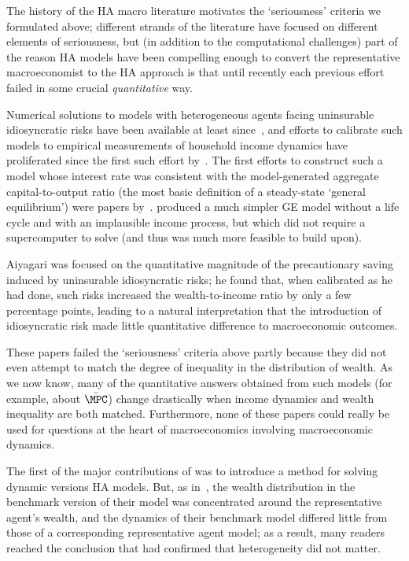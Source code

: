 \documentclass[titlepage]{econtex}
\begin{document}
The history of the HA macro literature motivates the `seriousness' criteria we formulated above; different strands of the literature have focused on different elements of seriousness, but (in addition to the computational challenges) part of the reason HA models have been compelling enough to convert the representative macroeconomist to the HA approach is that until recently each previous effort failed in some crucial {\it quantitative} way.

Numerical solutions to models with heterogeneous agents facing uninsurable idiosyncratic risks have been available at least since~\cite{zeldesStochastic}, and efforts to calibrate such models to empirical measurements of household income dynamics have proliferated since the first such effort by~\cite{carroll:brookings}.  The first efforts to construct such a model whose interest rate was consistent with the model-generated aggregate capital-to-output ratio (the most basic definition of a steady-state `general equilibrium') were papers by~\cite{hsz:importance,hsz:insurance}.  \cite{aiyagari:ge} produced a much simpler GE model without a life cycle and with an implausible income process, but which did not require a supercomputer to solve (and thus was much more feasible to build upon).

Aiyagari was focused on the quantitative magnitude of the precautionary saving induced by uninsurable idiosyncratic risks; he found that, when calibrated as he had done, such risks increased the wealth-to-income ratio by only a few percentage points, leading to a natural interpretation that the introduction of idiosyncratic risk made little quantitative difference to macroeconomic outcomes.

These papers failed the `seriousness' criteria above partly because they did not even attempt to match the degree of inequality in the distribution of wealth.  As we now know, many of the quantitative answers obtained from such models (for example, about $\bar{\MPC}$) change drastically when income dynamics and wealth inequality are both matched.  Furthermore, none of these papers could really be used for questions at the heart of macroeconomics involving macroeconomic dynamics.

The first of the major contributions of \cite{ksHetero} was to introduce a method for solving dynamic versions HA models.  But, as in~\cite{aiyagari:ge}, the wealth distribution in the benchmark version of their model was concentrated around the representative agent's wealth, and  the dynamics of their benchmark model differed little from those of a corresponding representative agent model; as a result, many readers reached the conclusion that \cite{ksHetero} had confirmed that heterogeneity did not matter.
\end{document}
